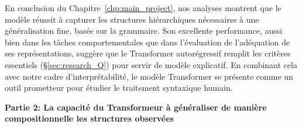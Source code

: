 En conclusion du Chapitre~\ref{chp:main_project}, nos analyses montrent que le modèle réussit à capturer les structures hiérarchiques nécessaires à une généralisation fine, basée sur la grammaire. Son excellente performance, aussi bien dans les tâches comportementales que dans l'évaluation de l'adéquation de ses représentations, suggère que le Transformer autorégressif remplit les critères essentiels (\S\ref{sec:research_Q}) pour servir de modèle explicatif. En combinant cela avec notre cadre d'interprétabilité, le modèle Transformer se présente comme un outil prometteur pour étudier le traitement syntaxique humain.

\vspace{0.5\baselineskip}
\noindent  \textbf{Partie 2: La capacité du Transformeur à généraliser de manière compositionnelle les structures observées}
\vspace{0.8\baselineskip}

